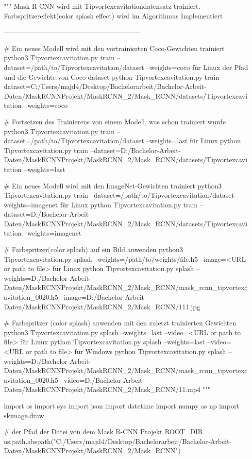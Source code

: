 """
Mask R-CNN wird mit Tipvortexcavitationdatensatz trainiert. Farbspritzereffekt(color splash effect) wird im Algorithmus Implementiert

------------------------------------------------------------

# Ein neues Modell wird mit den vortrainierten Coco-Gewichten trainiert
python3 Tipvortexcavitation.py train --dataset=/path/to/Tipvortexcavitation/dataset --weights=coco 
für Linux der Pfad und die Gewichte von Coco dataset
python  Tipvortexcavitation.py train --dataset=C:/Users/majd4/Desktop/Bachelorarbeit/Bachelor-Arbeit-Daten/MaskRCNNProjekt/MaskRCNN_2/Mask_RCNN/datasets/Tipvortexcavitation --weights=coco

# Fortsetzen des Trainierens von einem Modell, was schon trainiert wurde 
python3 Tipvortexcavitation.py train --dataset=/path/to/Tipvortexcavitation/dataset --weights=last für Linux 
python  Tipvortexcavitation.py train --dataset=D:/Bachelor-Arbeit-Daten/MaskRCNNProjekt/MaskRCNN_2/Mask_RCNN/datasets/Tipvortexcavitation --weights=last

# Ein neues Modell wird mit den ImageNet-Gewichten trainiert
python3 Tipvortexcavitation.py train --dataset=/path/to/Tipvortexcavitation/dataset --weights=imagenet für Linux
python  Tipvortexcavitation.py train --dataset=D:/Bachelor-Arbeit-Daten/MaskRCNNProjekt/MaskRCNN_2/Mask_RCNN/datasets/Tipvortexcavitation --weights=imagenet
    
# Farbspritzer(color splash) auf ein Bild anwenden
python3 Tipvortexcavitation.py splash --weights=/path/to/weights/file.h5 --image=<URL or path to file> für Linux
python Tipvortexcavitation.py  splash --weights=D:/Bachelor-Arbeit-Daten/MaskRCNNProjekt/MaskRCNN_2/Mask_RCNN/mask_rcnn_tipvortexcavitation_0020.h5 --image=D:/Bachelor-Arbeit-Daten/MaskRCNNProjekt/MaskRCNN_2/Mask_RCNN/111.jpg
    
# Farbspritzer (color splash) anwenden mit den zuletzt trainierten Gewichten
python3 Tipvortexcavitation.py splash --weights=last --video=<URL or path to file> für Linux
python  Tipvortexcavitation.py splash --weights=last --video=<URL or path to file>  für Windows
python Tipvortexcavitation.py splash --weights=D:/Bachelor-Arbeit-Daten/MaskRCNNProjekt/MaskRCNN_2/Mask_RCNN/mask_rcnn_tipvortexcavitation_0020.h5 --video=D:/Bachelor-Arbeit-Daten/MaskRCNNProjekt/MaskRCNN_2/Mask_RCNN/11.mp4 
"""

import os
import sys
import json
import datetime
import numpy as np
import skimage.draw

# der Pfad der Datei von dem Mask R-CNN Projekt 
ROOT_DIR = os.path.abspath("C:/Users/majd4/Desktop/Bachelorarbeit/Bachelor-Arbeit-Daten/MaskRCNNProjekt/MaskRCNN_2/Mask_RCNN")


